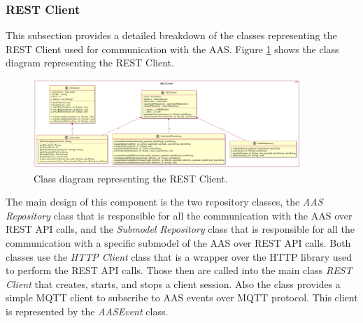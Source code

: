 \newpage
\subsubsection{REST Client}
This subsection provides a detailed breakdown of the classes representing the REST Client used for communication with the AAS.
Figure \ref{fig:rest_client_classes} shows the class diagram representing the REST Client.
\begin{figure}[ht]
    \centering
    \includegraphics[width=0.9\textwidth]{Images/Classes_Resource/REST_Client.png}
    \caption{Class diagram representing the REST Client.}
    \label{fig:rest_client_classes}
\end{figure}

The main design of this component is the two repository classes, the \emph{AAS Repository} class that is responsible for all the communication with the AAS over REST API calls, and the \emph{Submodel Repository} class that is responsible for all the communication with a specific submodel of the AAS over REST API calls.
Both classes use the \emph{HTTP Client} class that is a wrapper over the HTTP library used to perform the REST API calls.
Those then are called into the main class \emph{REST Client} that creates, starts, and stops a client session.
Also the class provides a simple MQTT client to subscribe to AAS events over MQTT protocol.
This client is represented by the \emph{AASEvent} class.

\newpage
